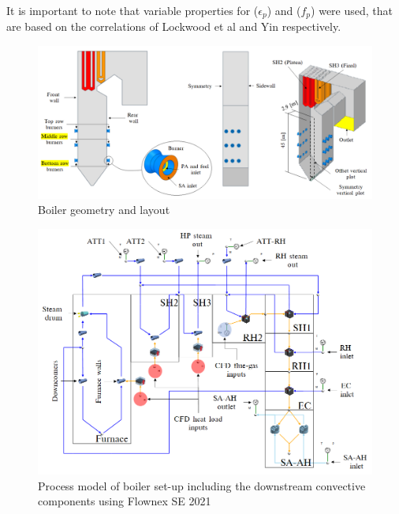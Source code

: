 \documentclass[twocolumn,10pt]{asme2ej}
\begin{document}
It is important to note that variable properties for ($\epsilon_p$) and ($f_p$) were used, that are based on the correlations of Lockwood et al \cite{Lockwood1986} and Yin \cite{Yin2015} respectively.
\begin{figure} 
\centerline{\includegraphics[scale=0.45]{GEOMETRY}}
\caption{Boiler geometry and layout}
\label{fig_geometry}
\end{figure}
\begin{figure}[h!]
\centering
\includegraphics[scale=0.5]{FLOWNEX_SETUP}
\caption{Process model of boiler set-up including the downstream convective components using Flownex SE 2021}
\label{fig_flownex}
\end{figure}
\end{document}

